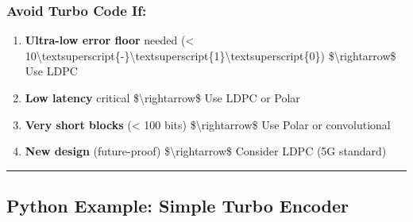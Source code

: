 \subsubsection{Avoid Turbo Code If:}\label{avoid-turbo-code-if}

\begin{enumerate}
\def\labelenumi{\arabic{enumi}.}
\tightlist
\item
  \textbf{Ultra-low error floor} needed (\textless{}
  10\textbackslash textsuperscript\{-\}\textbackslash textsuperscript\{1\}\textbackslash textsuperscript\{0\})
  \$\textbackslash rightarrow\$ Use LDPC
\item
  \textbf{Low latency} critical \$\textbackslash rightarrow\$ Use LDPC
  or Polar
\item
  \textbf{Very short blocks} (\textless{} 100 bits)
  \$\textbackslash rightarrow\$ Use Polar or convolutional
\item
  \textbf{New design} (future-proof) \$\textbackslash rightarrow\$
  Consider LDPC (5G standard)
\end{enumerate}

\begin{center}\rule{0.5\linewidth}{0.5pt}\end{center}

\subsection{Python Example: Simple Turbo
Encoder}\label{python-example-simple-turbo-encoder}


